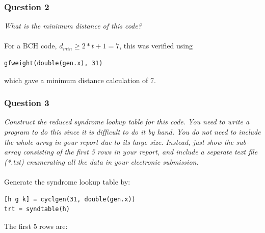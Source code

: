 \documentclass[a4paper]{article}
\begin{document}
\subsubsection{Question 2} \textit{What is the minimum distance of this code?} \\
\\
For a BCH code, $d_{min} \geq 2*t + 1 = 7$, this was verified using 
\begin{lstlisting}
gfweight(double(gen.x), 31)
\end{lstlisting}
which gave a minimum distance calculation of 7.

\subsubsection{Question 3} \textit{Construct the reduced syndrome lookup table for this code. You need to write a program to do this since it is difficult to do it by hand. You do not need to include the whole array in your report due to its large size. Instead, just show the sub-array consisting of the first 5 rows in your report, and include a separate text file (*.txt) enumerating all the data in your electronic submission.} \\
\\
Generate the syndrome lookup table by:
\begin{lstlisting}
[h g k] = cyclgen(31, double(gen.x))
trt = syndtable(h)
\end{lstlisting}

The first 5 rows are:\\
\end{document}
